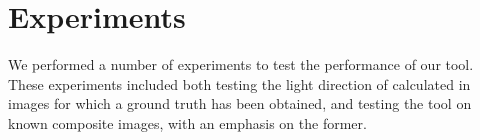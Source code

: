 \documentclass[10pt,twocolumn,letterpaper]{article}
\begin{document}
\section{Experiments}
We performed a number of experiments to test the performance of our tool. These experiments included both testing the light direction of calculated in images for which a ground truth has been obtained, and testing the tool on known composite images, with an emphasis on the former.

\end{document}
